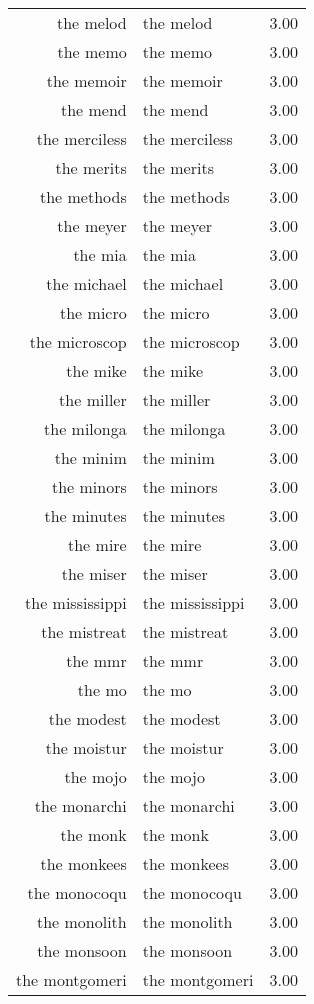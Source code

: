 \begin{table}[ht]
\begin{tabular}{rlr}
  the melod & the melod & 3.00 \\ 
  the memo & the memo & 3.00 \\ 
  the memoir & the memoir & 3.00 \\ 
  the mend & the mend & 3.00 \\ 
  the merciless & the merciless & 3.00 \\ 
  the merits & the merits & 3.00 \\ 
  the methods & the methods & 3.00 \\ 
  the meyer & the meyer & 3.00 \\ 
  the mia & the mia & 3.00 \\ 
  the michael & the michael & 3.00 \\ 
  the micro & the micro & 3.00 \\ 
  the microscop & the microscop & 3.00 \\ 
  the mike & the mike & 3.00 \\ 
  the miller & the miller & 3.00 \\ 
  the milonga & the milonga & 3.00 \\ 
  the minim & the minim & 3.00 \\ 
  the minors & the minors & 3.00 \\ 
  the minutes & the minutes & 3.00 \\ 
  the mire & the mire & 3.00 \\ 
  the miser & the miser & 3.00 \\ 
  the mississippi & the mississippi & 3.00 \\ 
  the mistreat & the mistreat & 3.00 \\ 
  the mmr & the mmr & 3.00 \\ 
  the mo & the mo & 3.00 \\ 
  the modest & the modest & 3.00 \\ 
  the moistur & the moistur & 3.00 \\ 
  the mojo & the mojo & 3.00 \\ 
  the monarchi & the monarchi & 3.00 \\ 
  the monk & the monk & 3.00 \\ 
  the monkees & the monkees & 3.00 \\ 
  the monocoqu & the monocoqu & 3.00 \\ 
  the monolith & the monolith & 3.00 \\ 
  the monsoon & the monsoon & 3.00 \\ 
  the montgomeri & the montgomeri & 3.00 \\ 

\end{tabular}
\end{table}
